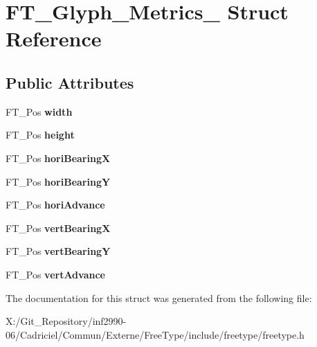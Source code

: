 \hypertarget{struct_f_t___glyph___metrics__}{\section{F\-T\-\_\-\-Glyph\-\_\-\-Metrics\-\_\- Struct Reference}
\label{struct_f_t___glyph___metrics__}
}
\subsection*{Public Attributes}
\begin{DoxyCompactItemize}
\item 
\hypertarget{struct_f_t___glyph___metrics___a0ff1be869e6a28d1f2990b0e5719dca9}{F\-T\-\_\-\-Pos {\bfseries width}}\label{struct_f_t___glyph___metrics___a0ff1be869e6a28d1f2990b0e5719dca9}

\item 
\hypertarget{struct_f_t___glyph___metrics___aa2a76ec448ec9d18acf343f01b77cb21}{F\-T\-\_\-\-Pos {\bfseries height}}\label{struct_f_t___glyph___metrics___aa2a76ec448ec9d18acf343f01b77cb21}

\item 
\hypertarget{struct_f_t___glyph___metrics___a2afc877f52c8a8910ec144a1948186cc}{F\-T\-\_\-\-Pos {\bfseries hori\-Bearing\-X}}\label{struct_f_t___glyph___metrics___a2afc877f52c8a8910ec144a1948186cc}

\item 
\hypertarget{struct_f_t___glyph___metrics___afd97c10d43ed1f66598a18884468b536}{F\-T\-\_\-\-Pos {\bfseries hori\-Bearing\-Y}}\label{struct_f_t___glyph___metrics___afd97c10d43ed1f66598a18884468b536}

\item 
\hypertarget{struct_f_t___glyph___metrics___af12db260a90b8a7c938ad48ebf20ccbe}{F\-T\-\_\-\-Pos {\bfseries hori\-Advance}}\label{struct_f_t___glyph___metrics___af12db260a90b8a7c938ad48ebf20ccbe}

\item 
\hypertarget{struct_f_t___glyph___metrics___aead5c5637b983b811738bff3bcea8cea}{F\-T\-\_\-\-Pos {\bfseries vert\-Bearing\-X}}\label{struct_f_t___glyph___metrics___aead5c5637b983b811738bff3bcea8cea}

\item 
\hypertarget{struct_f_t___glyph___metrics___a7f1aba91b86fddeb11030eab15dcce08}{F\-T\-\_\-\-Pos {\bfseries vert\-Bearing\-Y}}\label{struct_f_t___glyph___metrics___a7f1aba91b86fddeb11030eab15dcce08}

\item 
\hypertarget{struct_f_t___glyph___metrics___a594f43c64fe5c12a399a0f0a47c04990}{F\-T\-\_\-\-Pos {\bfseries vert\-Advance}}\label{struct_f_t___glyph___metrics___a594f43c64fe5c12a399a0f0a47c04990}

\end{DoxyCompactItemize}


The documentation for this struct was generated from the following file\-:\begin{DoxyCompactItemize}
\item 
X\-:/\-Git\-\_\-\-Repository/inf2990-\/06/\-Cadriciel/\-Commun/\-Externe/\-Free\-Type/include/freetype/freetype.\-h\end{DoxyCompactItemize}
